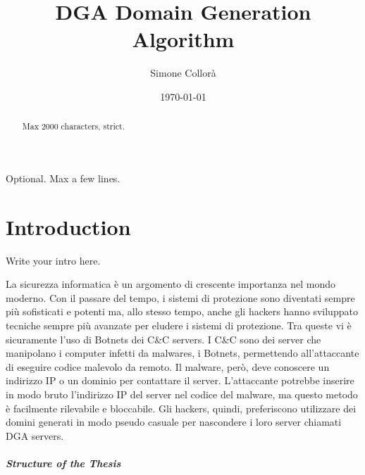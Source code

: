 \documentclass[12pt,a4paper,openright,twoside]{book}
\title{DGA Domain Generation Algorithm}
\author{Simone Collorà}
\date{\today}
\begin{document}
\frontmatter\frontispiece
\nocite{*}

\begin{abstract}	
Max 2000 characters, strict.
\end{abstract}

\begin{dedication} %
Optional. Max a few lines.
\end{dedication}

\tableofcontents   
\listoffigures     %
\lstlistoflistings %

\mainmatter

\chapter{Introduction}
\label{chap:introduction}

Write your intro here.

La sicurezza informatica è un argomento di crescente importanza
nel mondo moderno. Con il passare del tempo,
i sistemi di protezione sono diventati sempre più sofisticati
e potenti ma, allo stesso tempo, anche gli hackers 
hanno sviluppato tecniche sempre più avanzate per eludere i sistemi di protezione.
Tra queste vi è sicuramente l'uso di Botnets
dei \acrfull{C&C} servers. I \acrshort{C&C} sono dei server che manipolano
i computer infetti da malwares, i Botnets, permettendo
all'attaccante di eseguire codice malevolo da remoto.
Il malware, però, deve conoscere un indirizzo IP o un dominio
per contattare il server. L'attaccante potrebbe
inserire in modo bruto l'indirizzo IP del server nel codice del malware,
ma questo metodo è facilmente rilevabile e bloccabile.
Gli hackers, quindi, preferiscono utilizzare dei domini
generati in modo pseudo casuale per nascondere i loro server chiamati
\acrfull{DGA} servers.



\paragraph{Structure of the Thesis}
\end{document}
